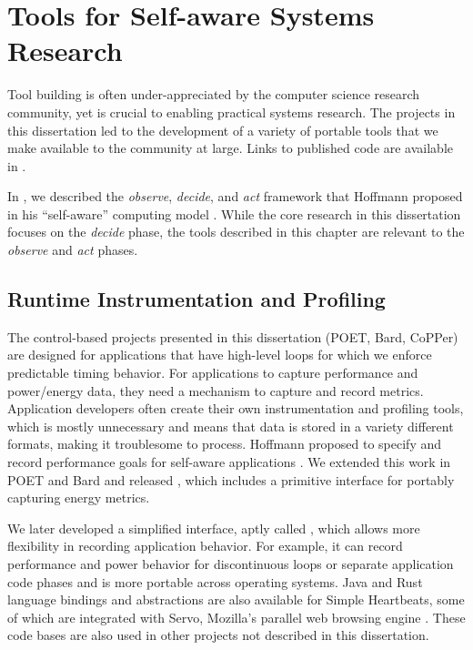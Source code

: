 \chapter{Tools for Self-aware Systems Research}
\label{app:tools}

Tool building is often under-appreciated by the computer science research community, yet is crucial to enabling practical systems research.
The projects in this dissertation led to the development of a variety of portable tools that we make available to the community at large.
Links to published code are available in .

In , we described the \emph{observe}, \emph{decide}, and \emph{act} framework that Hoffmann proposed in his ``self-aware'' computing model \cite{HoffmannPhD}.
While the core research in this dissertation focuses on the \emph{decide} phase, the tools described in this chapter are relevant to the \emph{observe} and \emph{act} phases.


\section{Runtime Instrumentation and Profiling}
\label{app:profiling}

The control-based projects presented in this dissertation (POET, Bard, CoPPer) are designed for applications that have high-level loops for which we enforce predictable timing behavior.
For applications to capture performance and power/energy data, they need a mechanism to capture and record metrics.
Application developers often create their own instrumentation and profiling tools, which is mostly unnecessary and means that data is stored in a variety different formats, making it troublesome to process.
Hoffmann \etal proposed  to specify and record performance goals for self-aware applications \cite{icac2010heartbeats}.
We extended this work in POET and Bard and released , which includes a primitive interface for portably capturing energy metrics.

We later developed a simplified interface, aptly called , which allows more flexibility in recording application behavior.
For example, it can record performance and power behavior for discontinuous loops or separate application code phases and is more portable across operating systems.
Java and Rust language bindings and abstractions are also available for Simple Heartbeats, some of which are integrated with Servo, Mozilla's parallel web browsing engine \cite{servo}.
These code bases are also used in other projects not described in this dissertation.

